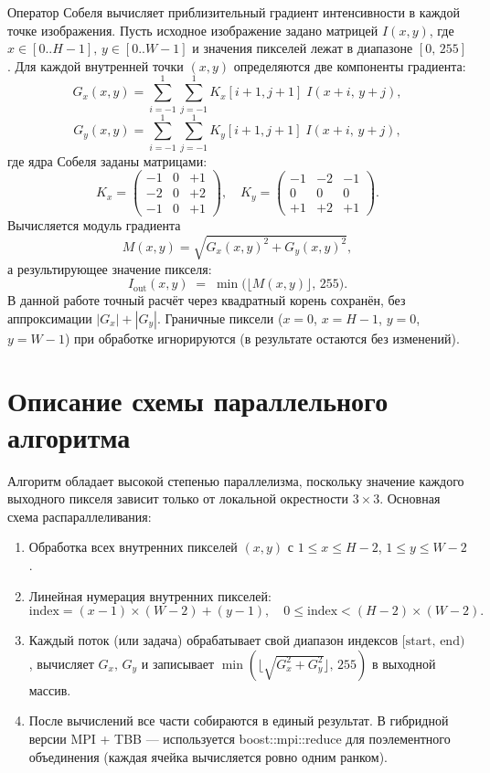 \documentclass[12pt]{article}
\begin{document}
Оператор Собеля вычисляет приблизительный градиент интенсивности в каждой точке изображения. Пусть исходное изображение задано матрицей $I(x,y)$, где $x\in[0..H-1],\,y\in[0..W-1]$ и значения пикселей лежат в диапазоне $[0,\,255]$. Для каждой внутренней точки $(x,y)$ определяются две компоненты градиента:
\[
G_x(x,y) = \sum_{i=-1}^{1} \sum_{j=-1}^{1} K_x[i+1,j+1]\;I(x+i,\,y+j),
\]
\[
G_y(x,y) = \sum_{i=-1}^{1} \sum_{j=-1}^{1} K_y[i+1,j+1]\;I(x+i,\,y+j),
\]
где ядра Собеля заданы матрицами:
\[
K_x = 
\begin{pmatrix}
-1 & 0 & +1 \\
-2 & 0 & +2 \\
-1 & 0 & +1
\end{pmatrix},\quad
K_y = 
\begin{pmatrix}
-1 & -2 & -1 \\
 0 &  0 &  0 \\
+1 & +2 & +1
\end{pmatrix}.
\]
Вычисляется модуль градиента
\[
M(x,y) = \sqrt{G_x(x,y)^2 + G_y(x,y)^2},
\]
а результирующее значение пикселя:
\[
I_{\text{out}}(x,y) \;=\; \min\bigl(\lfloor M(x,y)\rfloor,\,255\bigr).
\]
В данной работе точный расчёт через квадратный корень сохранён, без аппроксимации $|G_x| + |G_y|$. Граничные пиксели ($x=0$, $x=H-1$, $y=0$, $y=W-1$) при обработке игнорируются (в результате остаются без изменений).

\section{Описание схемы параллельного алгоритма}

Алгоритм обладает высокой степенью параллелизма, поскольку значение каждого выходного пикселя зависит только от локальной окрестности $3\times 3$. Основная схема распараллеливания:
\begin{enumerate}
    \item Обработка всех внутренних пикселей $(x,y)$ с $1 \le x \le H-2$, $1 \le y \le W-2$.
    \item Линейная нумерация внутренних пикселей: 
    \[
    \text{index} = (x - 1)\times (W - 2) + (y - 1),\quad 
    0 \le \text{index} < (H - 2)\times (W - 2).
    \]
    \item Каждый поток (или задача) обрабатывает свой диапазон индексов $\bigl[\text{start},\,\text{end}\bigr)$, вычисляет $G_x,\,G_y$ и записывает $\min(\lfloor\sqrt{G_x^2+G_y^2}\rfloor,\,255)$ в выходной массив.
    \item После вычислений все части собираются в единый результат. В гибридной версии MPI + TBB — используется boost::mpi::reduce для поэлементного объединения (каждая ячейка вычисляется ровно одним ранком).
\end{enumerate}
\end{document}
